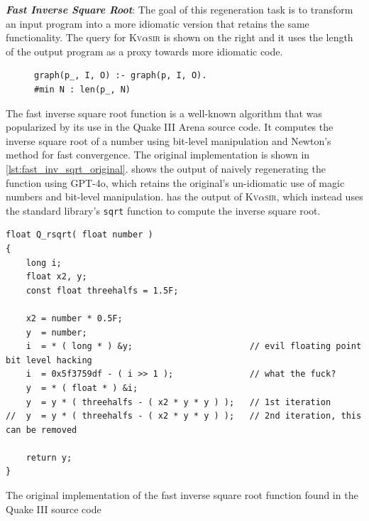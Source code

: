 \documentclass[nonacm,sigplan,review]{acmart}
\def\gptmodel{{GPT-4o}\xspace}
\newcommand{\sys}{{\scshape Kv{$\alpha$}sir}\xspace}
\newcommand{\heading}[1]{\vspace{2pt}\noindent\textbf{\emph{#1}}:\enspace}
\newcommand{\ttt}[1]{\texttt{#1}\xspace}
\begin{document}
\heading{Fast Inverse Square Root}
The goal of this regeneration task is to transform an input 
program into a more idiomatic version that retains the same functionality.
The query for \sys is shown on the right and it uses the length of the output program as a proxy towards 
more idiomatic code.
\begin{figure}
\begin{verbatim}
graph(p_, I, O) :- graph(p, I, O).
#min N : len(p_, N)
\end{verbatim}
\end{figure}
The fast inverse square root function is a well-known algorithm that was
popularized by its use in the Quake III Arena source code.
It computes the inverse square root of a number using bit-level manipulation and
Newton's method for fast convergence.
The original implementation is shown in \cref{lst:fast_inv_sqrt_original}.
 shows the output of naively regenerating the function using \gptmodel,
which retains the original's un-idiomatic use of magic numbers and bit-level manipulation.
 has the output of \sys, which instead uses the standard library's
\ttt{sqrt} function to compute the inverse square root.

\begin{listing}[htpb]
\begin{verbatim}
float Q_rsqrt( float number )
{
	long i;
	float x2, y;
	const float threehalfs = 1.5F;

	x2 = number * 0.5F;
	y  = number;
	i  = * ( long * ) &y;                       // evil floating point bit level hacking
	i  = 0x5f3759df - ( i >> 1 );               // what the fuck?
	y  = * ( float * ) &i;
	y  = y * ( threehalfs - ( x2 * y * y ) );   // 1st iteration
//	y  = y * ( threehalfs - ( x2 * y * y ) );   // 2nd iteration, this can be removed

	return y;
}
\end{verbatim}
  \caption{The original implementation of the fast inverse square root function 
  found in the Quake III source code~\cite{fast_inv_sqrt}}
  \label{lst:fast_inv_sqrt_original}
\end{listing}
\end{document}

